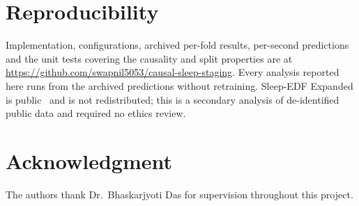 \documentclass[conference]{IEEEtran}
\begin{document}
\section*{Reproducibility}
\sloppy

Implementation, configurations, archived per-fold results, per-second predictions and the unit tests
covering the causality and split properties are at
\url{https://github.com/swapnil5053/causal-sleep-staging}. Every analysis reported here runs from the
archived predictions without retraining. Sleep-EDF Expanded is public~\cite{physionet,kemp} and is not
redistributed; this is a secondary analysis of de-identified public data and required no ethics review.

\section*{Acknowledgment}

The authors thank Dr.\ Bhaskarjyoti Das for supervision throughout this project.
\end{document}
